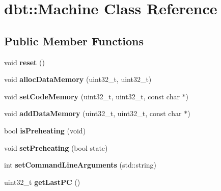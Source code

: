 \hypertarget{classdbt_1_1_machine}{}\section{dbt\+:\+:Machine Class Reference}
\label{classdbt_1_1_machine}
\subsection*{Public Member Functions}
\begin{DoxyCompactItemize}
\item 
void {\bfseries reset} ()\hypertarget{classdbt_1_1_machine_af4376a00206c3e7cad3294c3061320f4}{}\label{classdbt_1_1_machine_af4376a00206c3e7cad3294c3061320f4}

\item 
void {\bfseries alloc\+Data\+Memory} (uint32\+\_\+t, uint32\+\_\+t)\hypertarget{classdbt_1_1_machine_adadfdadbb10bfa1828949cc3ba3539de}{}\label{classdbt_1_1_machine_adadfdadbb10bfa1828949cc3ba3539de}

\item 
void {\bfseries set\+Code\+Memory} (uint32\+\_\+t, uint32\+\_\+t, const char $\ast$)\hypertarget{classdbt_1_1_machine_ae7ea0283ec3d78901485f5bdbc44c33e}{}\label{classdbt_1_1_machine_ae7ea0283ec3d78901485f5bdbc44c33e}

\item 
void {\bfseries add\+Data\+Memory} (uint32\+\_\+t, uint32\+\_\+t, const char $\ast$)\hypertarget{classdbt_1_1_machine_a0614b04f790e70983b99ae1c58cb9e4c}{}\label{classdbt_1_1_machine_a0614b04f790e70983b99ae1c58cb9e4c}

\item 
bool {\bfseries is\+Preheating} (void)\hypertarget{classdbt_1_1_machine_ae9857ab32203ba67af61fc9e42e6f483}{}\label{classdbt_1_1_machine_ae9857ab32203ba67af61fc9e42e6f483}

\item 
void {\bfseries set\+Preheating} (bool state)\hypertarget{classdbt_1_1_machine_a07ade7e51bb052aece7d76859ee2bbc5}{}\label{classdbt_1_1_machine_a07ade7e51bb052aece7d76859ee2bbc5}

\item 
int {\bfseries set\+Command\+Line\+Arguments} (std\+::string)\hypertarget{classdbt_1_1_machine_a68433e4bdf46d4a826ba5823f504c17b}{}\label{classdbt_1_1_machine_a68433e4bdf46d4a826ba5823f504c17b}

\item 
uint32\+\_\+t {\bfseries get\+Last\+PC} ()\hypertarget{classdbt_1_1_machine_aa2b9f83e24a84f352329e8f01dba0879}{}\label{classdbt_1_1_machine_aa2b9f83e24a84f352329e8f01dba0879}


\end{DoxyCompactItemize}
